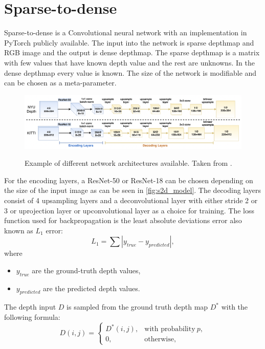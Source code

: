 \documentclass[twoside]{ctuthesis}
\theoremstyle{plain}
\theoremstyle{definition}
\theoremstyle{note}
\begin{document}
\section{Sparse-to-dense} \label{s2d}
Sparse-to-dense \cite{ma2018sparsetodense} is a Convolutional neural network with an implementation in PyTorch publicly available. The input into the network is sparse depthmap and RGB image and the output is dense depthmap.  The sparse depthmap is a matrix with few values that have known depth value and the rest are unknowns. In the dense depthmap every value is known. The size of the network is modifiable and can be chosen as a meta-parameter.
\begin{figure}
	\caption[Example of different network architectures available.]{Example of different network architectures available. Taken from \cite{ma2018sparsetodense}.}
	\includegraphics[width=\textwidth]{sparse2dense.png}
	\centering
	\label{fig:s2d_model}
\end{figure}
For the encoding layers, a ResNet-50 or ResNet-18 can be chosen depending on the size of the input image as can be seen in \autoref{fig:s2d_model}. The decoding layers consist of 4 upsampling layers and a deconvolutional layer with either stride 2 or 3 or uprojection layer or upconvolutional layer as a choice for training. The loss function used for backpropagation is the least absolute deviations error also known as $L_1$ error:
\begin{equation}
	L_1=\sum|y_{true}-y_{predicted}|,
\end{equation}
where
\begin{itemize}
	\item $y_{true}$ are the ground-truth depth values,
	\item $y_{predicted}$ are the predicted depth values.
\end{itemize}
The depth input $D$ is sampled from the ground truth depth map $D^*$ with the following formula:
\begin{equation}
	D(i,j)=\begin{cases}
		D^*(i,j),&\text{with probability}\ p,\\
		0,&\text{otherwise},
	\end{cases}
\end{equation}
\end{document}
